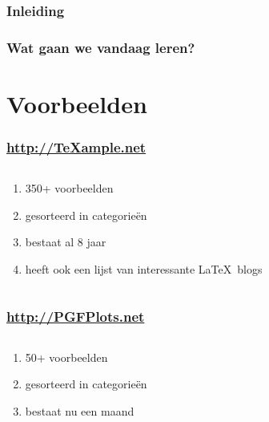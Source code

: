 \documentclass[]{beamer}
\begin{document}
\begin{frame}
  \frametitle{Inleiding}
\end{frame}

\begin{frame}
  \frametitle{Wat gaan we vandaag leren?}
\end{frame}

\section{Voorbeelden}

\begin{frame}
  \frametitle{\url{http://TeXample.net}}

  \begin{columns}
    \begin{column}{.4\textwidth}
      \begin{enumerate}
        \item 350+ voorbeelden
        \item gesorteerd in categorie\"en
        \item bestaat al 8 jaar
        \item heeft ook een lijst van interessante \LaTeX\ blogs
      \end{enumerate}
    \end{column}

    \begin{column}{.6\textwidth}
      \begin{flushright}
      \end{flushright}
    \end{column}
  \end{columns}
\end{frame}

\begin{frame}
  \frametitle{\url{http://PGFPlots.net}}

  \begin{columns}
    \begin{column}{.4\textwidth}
      \begin{enumerate}
        \item 50+ voorbeelden
        \item gesorteerd in categorie\"en
        \item bestaat nu een maand
      \end{enumerate}
    \end{column}

    \begin{column}{.6\textwidth}
      \begin{flushright}
      \end{flushright}
    \end{column}
  \end{columns}
\end{frame}
\end{document}
